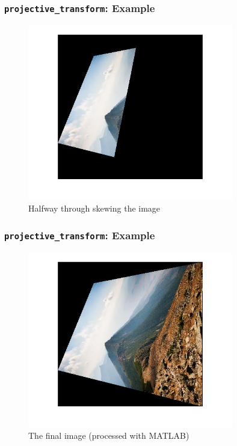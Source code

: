 \documentclass{beamer}
\begin{document}
\begin{frame}
	\frametitle{{\tt projective\_transform}: Example}
	\begin{figure}
		\centering
		\includegraphics[width=0.8\textwidth]{images/skew_example/projected_halfway.jpg}
		\caption{Halfway through skewing the image}
	\end{figure}
\end{frame}

\begin{frame}
	\frametitle{{\tt projective\_transform}: Example}
	\begin{figure}
		\centering
		\includegraphics[width=0.8\textwidth]{images/skew_example/projected_final.jpg}
		\caption{The final image (processed with MATLAB)}
	\end{figure}
\end{frame}
\end{document}
